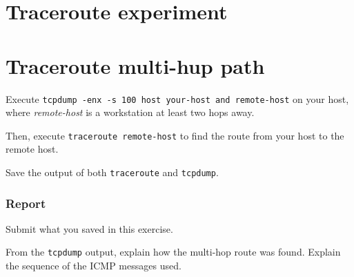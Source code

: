 \documentclass{../UTNetLab}
\begin{document}
\section*{Traceroute experiment}
\section{Traceroute multi-hup path}
    Execute \lstinline[emph={your-host, remote-host}]{tcpdump -enx -s 100 host your-host and remote-host} on your host, where \textit{remote-host} is a workstation at least two hops away. 

    Then, execute \lstinline[emph={your-host, remote-host}]{traceroute remote-host} to find the route from your host to the remote host. 

    Save the output of both \lstinline{traceroute} and \lstinline{tcpdump}.

    \subsubsection*{Report}
    Submit what you saved in this exercise. 

    From the \lstinline{tcpdump} output, explain how the multi-hop route was found.
    Explain the sequence of the ICMP messages used.
\end{document}
